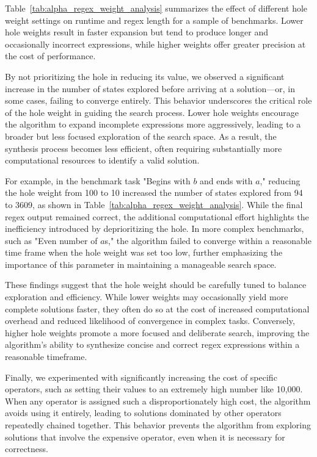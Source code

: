 \indent\indent Table~\ref{tab:alpha_regex_weight_analysis} summarizes the effect of different hole weight settings on runtime and regex length for a sample of benchmarks. Lower hole weights result in faster expansion but tend to produce longer and occasionally incorrect expressions, while higher weights offer greater precision at the cost of performance.

\indent\indent By not prioritizing the hole in reducing its value, we observed a significant increase in the number of states explored before arriving at a solution—or, in some cases, failing to converge entirely. This behavior underscores the critical role of the hole weight in guiding the search process. Lower hole weights encourage the algorithm to expand incomplete expressions more aggressively, leading to a broader but less focused exploration of the search space. As a result, the synthesis process becomes less efficient, often requiring substantially more computational resources to identify a valid solution.

\indent\indent For example, in the benchmark task "Begins with $b$ and ends with $a$," reducing the hole weight from 100 to 10 increased the number of states explored from 94 to 3609, as shown in Table~\ref{tab:alpha_regex_weight_analysis}. While the final regex output remained correct, the additional computational effort highlights the inefficiency introduced by deprioritizing the hole. In more complex benchmarks, such as "Even number of $a$s," the algorithm failed to converge within a reasonable time frame when the hole weight was set too low, further emphasizing the importance of this parameter in maintaining a manageable search space.

\indent\indent These findings suggest that the hole weight should be carefully tuned to balance exploration and efficiency. While lower weights may occasionally yield more complete solutions faster, they often do so at the cost of increased computational overhead and reduced likelihood of convergence in complex tasks. Conversely, higher hole weights promote a more focused and deliberate search, improving the algorithm's ability to synthesize concise and correct regex expressions within a reasonable timeframe.

\indent\indent Finally, we experimented with significantly increasing the cost of specific operators, such as setting their values to an extremely high number like 10,000. When any operator is assigned such a disproportionately high cost, the algorithm avoids using it entirely, leading to solutions dominated by other operators repeatedly chained together. This behavior prevents the algorithm from exploring solutions that involve the expensive operator, even when it is necessary for correctness.

